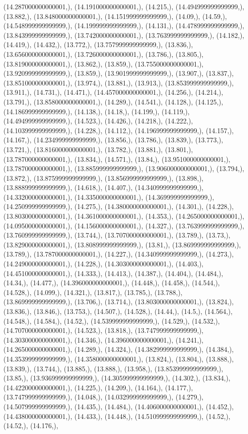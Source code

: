 \documentclass{article}
\begin{document}
(14.287000000000001,), (14.191000000000001,), (14.215,), (14.494999999999999,), (13.882,), (13.848000000000001,), (14.151999999999999,), (14.09,), (14.59,), (14.548999999999999,), (14.199999999999999,), (14.131,), (14.478999999999999,), (13.843999999999999,), (13.742000000000001,), (13.763999999999999,), (14.182,), (14.419,), (14.432,), (13.772,), (13.757999999999999,), (13.836,), (13.656000000000001,), (13.726000000000001,), (13.786,), (13.805,), (13.819000000000001,), (13.862,), (13.859,), (13.755000000000001,), (13.920999999999999,), (13.859,), (13.901999999999999,), (13.907,), (13.837,), (13.851000000000001,), (13.974,), (13.881,), (13.913,), (13.853999999999999,), (13.911,), (14.731,), (14.471,), (14.457000000000001,), (14.256,), (14.214,), (13.791,), (13.858000000000001,), (14.289,), (14.541,), (14.128,), (14.125,), (14.186999999999999,), (14.138,), (14.18,), (14.199,), (14.119,), (14.494999999999999,), (14.523,), (14.426,), (14.218,), (14.222,), (14.103999999999999,), (14.228,), (14.112,), (14.196999999999999,), (14.157,), (14.167,), (14.234999999999999,), (13.856,), (13.786,), (13.839,), (13.773,), (13.721,), (13.816000000000001,), (13.782,), (13.881,), (13.801,), (13.787000000000001,), (13.834,), (14.571,), (13.84,), (13.951000000000001,), (13.787000000000001,), (13.885999999999999,), (13.906000000000001,), (13.794,), (13.872,), (13.875999999999999,), (13.856999999999999,), (13.898,), (13.888999999999999,), (14.618,), (14.407,), (14.340999999999999,), (14.332000000000001,), (14.335000000000001,), (14.369999999999999,), (14.250999999999999,), (14.275,), (14.380000000000001,), (14.301,), (14.228,), (13.803000000000001,), (14.361000000000001,), (14.353,), (14.265000000000001,), (14.095000000000001,), (14.156000000000001,), (14.327,), (13.763999999999999,), (13.760999999999999,), (13.744,), (13.707000000000001,), (13.789,), (13.73,), (13.829000000000001,), (13.808999999999999,), (13.81,), (13.869999999999999,), (13.789,), (13.787000000000001,), (14.227,), (14.340999999999999,), (14.273,), (14.249000000000001,), (14.228,), (14.303000000000001,), (14.403,), (14.451000000000001,), (14.333,), (14.413,), (14.387,), (14.404,), (14.484,), (14.34,), (14.477,), (14.396000000000001,), (14.448,), (14.458,), (14.544,), (14.528,), (14.099,), (14.321,), (13.817,), (13.785,), (13.788,), (13.869999999999999,), (13.706,), (13.714,), (13.803000000000001,), (13.824,), (13.836,), (13.846,), (13.753,), (14.507,), (14.528,), (14.44,), (14.5,), (14.564,), (14.548,), (14.584,), (14.52,), (14.539999999999999,), (14.529,), (14.532,), (14.707000000000001,), (14.523,), (13.818,), (13.747999999999999,), (14.303000000000001,), (14.346,), (14.396000000000001,), (14.241,), (14.265000000000001,), (14.289,), (14.324,), (14.382999999999999,), (14.384,), (14.353999999999999,), (14.358000000000001,), (13.824,), (13.804,), (13.888,), (13.839,), (13.744,), (13.885,), (13.888,), (13.958,), (13.853999999999999,), (13.85,), (13.936999999999999,), (14.305999999999999,), (14.302,), (13.834,), (14.422000000000001,), (14.225,), (14.209,), (14.164,), (14.177,), (13.747999999999999,), (14.048,), (14.032999999999999,), (14.279,), (14.507999999999999,), (14.435,), (14.484,), (14.406000000000001,), (14.452,), (14.438000000000001,), (14.433,), (14.448,), (14.510999999999999,), (14.52,), (14.52,), (14.176,), 
\end{document}
